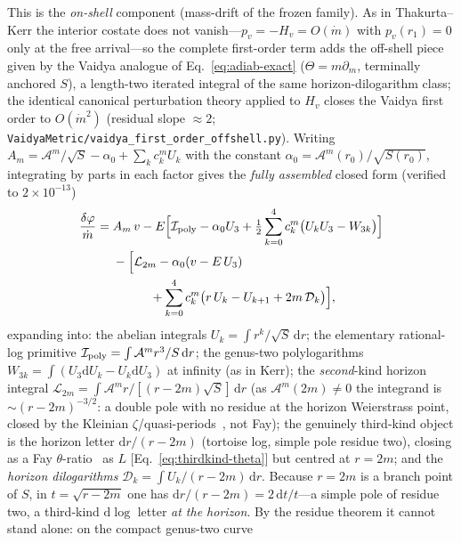 \documentclass[
    aps, prd, twocolumn, superscriptaddress,
    showpacs, nofootinbib, floatfix
]{revtex4-2}
\newcommand{\dd}{\mathrm{d}}
\begin{document}
This is the \emph{on-shell} component (mass-drift of the frozen family). As in
Thakurta--Kerr the interior costate does not vanish---$p_v=-H_v=O(\dot m)$ with
$p_v(r_1)=0$ only at the free arrival---so the complete first-order term adds the
off-shell piece given by the Vaidya analogue of Eq.~\eqref{eq:adiab-exact}
($\Theta=m\partial_m$, terminally anchored $S$), a length-two iterated integral of the
same horizon-dilogarithm class; the identical canonical perturbation theory applied to
$H_v$ closes the Vaidya first order to $O(\dot m^2)$ (residual slope $\approx2$;
\texttt{VaidyaMetric/vaidya\_first\_order\_offshell.py}).
Writing $A_m=\mathcal{A}^m/\sqrt S-\alpha_0+\sum_k c_k^m U_k$ with the constant
$\alpha_0=\mathcal{A}^m(r_0)/\sqrt{S(r_0)}$, integrating by parts in each factor
gives the \emph{fully assembled} closed form (verified to $2\times10^{-13}$)
\begin{equation}
\begin{aligned}
    \frac{\delta\varphi}{\dot m}
    ={}&A_m\,v
    -E\Big[\mathcal{I}_{\rm poly}-\alpha_0 U_3
        +\tfrac12\sum_{k=0}^4 c_k^m\big(U_kU_3-W_{3k}\big)\Big]\\
    &{}-\Big[\mathcal{L}_{2m}-\alpha_0(v-E\,U_3)\\
    &\qquad\quad{}+\sum_{k=0}^4 c_k^m\big(r\,U_k-U_{k+1}+2m\,\mathcal{D}_k\big)\Big],
\end{aligned}
    \label{eq:vaidya-full}
\end{equation}
expanding into: the abelian integrals $U_k=\int r^k/\sqrt S\,\dd r$; the elementary
rational-log primitive $\mathcal{I}_{\rm poly}=\int\mathcal{A}^m r^3/S\,\dd r$; the
genus-two polylogarithms $W_{3k}=\int(U_3\dd U_k-U_k\dd U_3)$ at infinity (as in
Kerr); the \emph{second}-kind horizon integral
$\mathcal{L}_{2m}=\int\mathcal{A}^m r/[(r-2m)\sqrt S]\,\dd r$ (as
$\mathcal{A}^m(2m)\ne0$ the integrand is $\sim(r-2m)^{-3/2}$: a double pole with no
residue at the horizon Weierstrass point, closed by the Kleinian
$\zeta$/quasi-periods~\cite{BuchstaberEnolskii1997,BakerAbelian1897}, not Fay); the
genuinely third-kind object is the horizon letter $\dd r/(r-2m)$ (tortoise log, simple
pole residue two), closing as a Fay $\theta$-ratio~\cite{Fay1973} as $L$
[Eq.~\eqref{eq:thirdkind-theta}] but centred at $r=2m$; and
the \emph{horizon dilogarithms} $\mathcal{D}_k=\int U_k/(r-2m)\,\dd r$. Because $r=2m$
is a branch point of $S$, in $t=\sqrt{r-2m}$ one has $\dd r/(r-2m)=2\,\dd t/t$---a
simple pole of residue two, a third-kind $\dd\log$ letter \emph{at the horizon}. By
the residue theorem it cannot stand alone: on the compact genus-two curve
\end{document}
